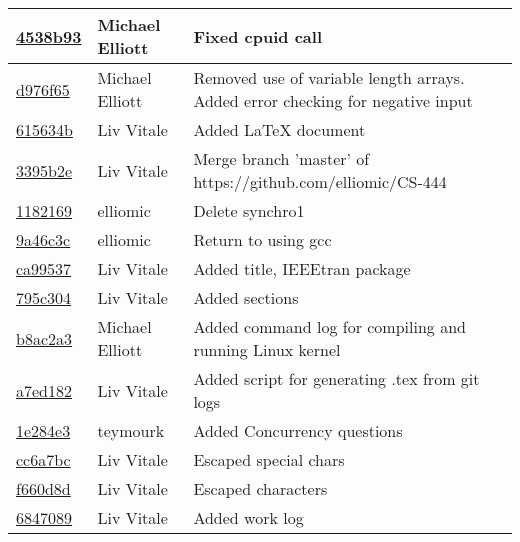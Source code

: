 \documentclass[letterpaper,10pt,titlepage,draftclsnofoot,onecolumn]{IEEEtran}
\begin{document}
\begin{tabular}{l l l}
\href{https://github.com/elliomic/CS-444/commit/4538b939bed2cc80ab0b8940c419877d51f693bc}{4538b93} & Michael Elliott & Fixed cpuid call\\\hline
\href{https://github.com/elliomic/CS-444/commit/d976f657bc72165f444aac68eeecfdda2d2e1afe}{d976f65} & Michael Elliott & Removed use of variable length arrays. Added error checking for negative input\\\hline
\href{https://github.com/elliomic/CS-444/commit/615634bdd2be122c6401c6c7ccf23e457ca09c84}{615634b} & Liv Vitale & Added LaTeX document\\\hline
\href{https://github.com/elliomic/CS-444/commit/3395b2e4d682283838e8cb97063e5517bb5b5d30}{3395b2e} & Liv Vitale & Merge branch 'master' of https://github.com/elliomic/CS-444\\\hline
\href{https://github.com/elliomic/CS-444/commit/1182169eca1f04759352581b206d7715f24499ca}{1182169} & elliomic & Delete synchro1\\\hline
\href{https://github.com/elliomic/CS-444/commit/9a46c3c9bab82e9618cddc3e1ddca4f4e3ae0765}{9a46c3c} & elliomic & Return to using gcc\\\hline
\href{https://github.com/elliomic/CS-444/commit/ca99537566dcc4c0aa6cac3e045d5fefad09dd46}{ca99537} & Liv Vitale & Added title, IEEEtran package\\\hline
\href{https://github.com/elliomic/CS-444/commit/795c3046ccb4c7bab06b6d779d74d179c68776d6}{795c304} & Liv Vitale & Added sections\\\hline
\href{https://github.com/elliomic/CS-444/commit/b8ac2a387ab9dca744d2063979ae316506860c55}{b8ac2a3} & Michael Elliott & Added command log for compiling and running Linux kernel\\\hline
\href{https://github.com/elliomic/CS-444/commit/a7ed1820ead89a461627e47e171f3de86208199c}{a7ed182} & Liv Vitale & Added script for generating .tex from git logs\\\hline
\href{https://github.com/elliomic/CS-444/commit/1e284e3a9848cf7b3c281c86e4d0bf738b2ba78e}{1e284e3} & teymourk & Added Concurrency questions\\\hline
\href{https://github.com/elliomic/CS-444/commit/cc6a7bce3e24bd2b737129c50a82f9e9217d1553}{cc6a7bc} & Liv Vitale & Escaped special chars\\\hline
\href{https://github.com/elliomic/CS-444/commit/f660d8dc7b162be993a0823f90730740dd68b9c8}{f660d8d} & Liv Vitale & Escaped characters\\\hline
\href{https://github.com/elliomic/CS-444/commit/6847089ba9f576200b15793b9ade667cf424751b}{6847089} & Liv Vitale & Added work log\\\hline

\end{tabular}
\end{document}
